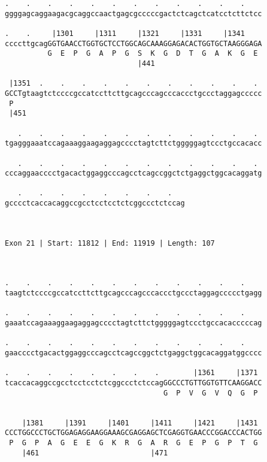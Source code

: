 \documentclass{article}
\begin{document}
\begin{Verbatim}
.    .    .    .    .    .    .    .    .    .    .    .    
ggggagcaggaagacgcaggccaactgagcgcccccgactctcagctcatcctcttctcc
                                                            
.    .     |1301     |1311     |1321     |1331     |1341    
ccccttgcagGGTGAACCTGGTGCTCCTGGCAGCAAAGGAGACACTGGTGCTAAGGGAGA
          G  E  P  G  A  P  G  S  K  G  D  T  G  A  K  G  E 
                               |441                         
  
 |1351  .    .    .    .    .    .    .    .    .    .    . 
GCCTgtaagtctccccgccatccttcttgcagcccagcccaccctgccctaggagccccc
 P                                                          
 |451                                                       
  
   .    .    .    .    .    .    .    .    .    .    .    . 
tgagggaaatccagaaaggaagaggagcccctagtcttctgggggagtccctgccacacc
                                                            
   .    .    .    .    .    .    .    .    .    .    .    . 
cccaggaacccctgacactggaggcccagcctcagccggctctgaggctggcacaggatg
                                                            
   .    .    .    .    .    .    .    .   
gcccctcaccacaggccgcctcctcctctcggccctctccag
                                          
                                          
 
Exon 21 | Start: 11812 | End: 11919 | Length: 107



.    .    .    .    .    .    .    .    .    .    .    .    
taagtctccccgccatccttcttgcagcccagcccaccctgccctaggagccccctgagg
                                                            
.    .    .    .    .    .    .    .    .    .    .    .    
gaaatccagaaaggaagaggagcccctagtcttctgggggagtccctgccacacccccag
                                                            
.    .    .    .    .    .    .    .    .    .    .    .    
gaacccctgacactggaggcccagcctcagccggctctgaggctggcacaggatggcccc
                                                            
.    .    .    .    .    .    .    .        |1361     |1371 
tcaccacaggccgcctcctcctctcggccctctccagGGCCCTGTTGGTGTTCAAGGACC
                                     G  P  V  G  V  Q  G  P 
                                                            
  
    |1381     |1391     |1401     |1411     |1421     |1431 
CCCTGGCCCTGCTGGAGAGGAAGGAAAGCGAGGAGCTCGAGGTGAACCCGGACCCACTGG
 P  G  P  A  G  E  E  G  K  R  G  A  R  G  E  P  G  P  T  G 
    |461                          |471                      
  

\end{Verbatim}
\end{document}
